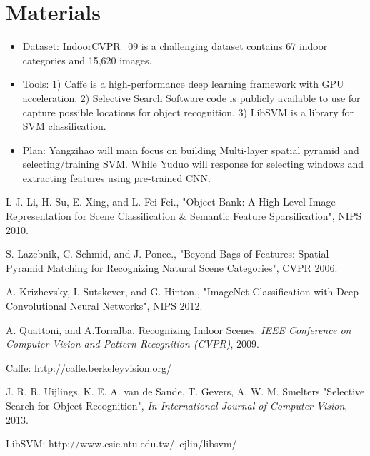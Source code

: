 \documentclass[letterpaper,twocolumn,10pt]{article}
\begin{document}
\section{Materials}
	\begin{itemize}
	\item{Dataset:}
	IndoorCVPR\_09\cite{DATA} is a challenging dataset contains 67
	indoor categories and 15,620 images.

	\item{Tools:}
	1) Caffe\cite{CAFFE} is a high-performance deep learning framework
	with GPU acceleration.
	2) Selective Search Software\cite{SS} code is publicly available to use
	for capture possible locations for object recognition.
	3) LibSVM\cite{SVM} is a library for SVM classification.

	\item{Plan:}
	Yangzihao will main focus on building Multi-layer spatial pyramid and
	selecting/training SVM. While Yuduo will response for selecting windows and
	extracting features using pre-trained CNN.
	\end{itemize}

\begin{thebibliography}{10}

 L-J. Li, H. Su, E. Xing, and L. Fei-Fei.,
"Object Bank: A High-Level Image Representation for Scene Classification
\& Semantic Feature Sparsification",
NIPS 2010.

 S. Lazebnik, C. Schmid, and J. Ponce.,
"Beyond Bags of Features:
Spatial Pyramid Matching for Recognizing Natural Scene Categories",
CVPR 2006.

 A. Krizhevsky, I. Sutskever, and G. Hinton.,
"ImageNet Classification with Deep Convolutional Neural Networks",
NIPS 2012.

 A. Quattoni, and A.Torralba. Recognizing Indoor Scenes.
\emph{IEEE Conference on Computer Vision and Pattern Recognition (CVPR)},
2009.

 Caffe: http://caffe.berkeleyvision.org/

 J. R. R. Uijlings, K. E. A. van de Sande,
T. Gevers, A. W. M. Smelters
"Selective Search for Object Recognition",
\emph{In International Journal of Computer Vision}, 2013.

 LibSVM: http://www.csie.ntu.edu.tw/~cjlin/libsvm/

\end{thebibliography}
\end{document}
